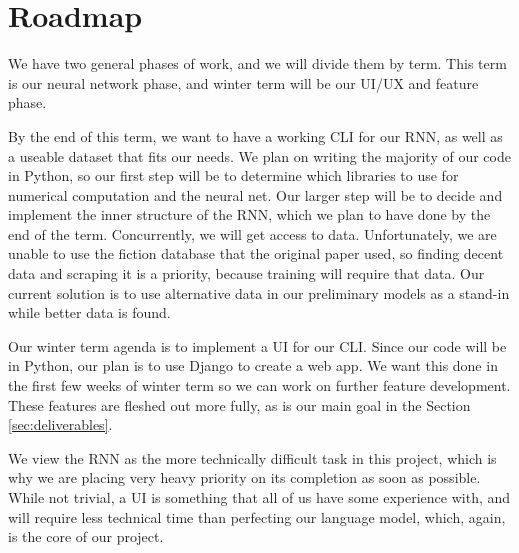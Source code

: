 \section{Roadmap}\label{sec:roadmap}
We have two general phases of work, and we will divide them by term.
This term is our neural network phase, and winter term will be our UI/UX and
feature phase.

By the end of this term, we want to have a working CLI for our RNN, as well
as a useable dataset that fits our needs. We plan on writing the majority of
our code in Python, so our first step will be to determine which libraries to
use for numerical computation and the neural net. Our larger step will be to
decide and implement the inner structure of the RNN,  which we plan to have
done by the end of the term. Concurrently, we will get access to data.
Unfortunately, we are unable to use the fiction database that the original
paper\cite{clark} used, so finding decent data and scraping it is a priority,
because training will require that data. Our current solution is to use
alternative data in our preliminary models as a stand-in while better data
is found.

Our winter term agenda is to implement a UI for our CLI. Since our code will
be in Python, our plan is to use Django to create a web app. We want this done
in the first few weeks of winter term so we can work on further feature development.
These features are fleshed out more fully, as is our main goal in the Section \ref{sec:deliverables}.

We view the RNN as the more technically difficult task in this project, which
is why we are placing very heavy priority on its completion as soon as possible.
While not trivial, a UI is something that all of us have some experience with,
and will require less technical time than perfecting our language model, which,
again, is the core of our project.
